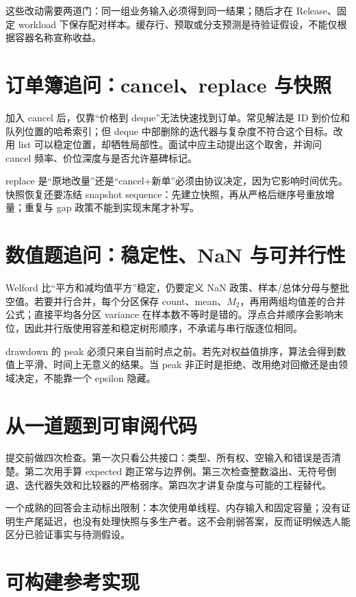 这些改动需要两道门：同一组业务输入必须得到同一结果；随后才在 Release、固定 workload 下保存配对样本。缓存行、预取或分支预测是待验证假设，不能仅根据容器名称宣称收益。

\section{订单簿追问：cancel、replace 与快照}

加入 cancel 后，仅靠“价格到 deque”无法快速找到订单。常见解法是 ID 到价位和队列位置的哈希索引；但 deque 中部删除的迭代器与复杂度不符合这个目标。改用 list 可以稳定位置，却牺牲局部性。面试中应主动提出这个取舍，并询问 cancel 频率、价位深度与是否允许墓碑标记。

replace 是“原地改量”还是“cancel+新单”必须由协议决定，因为它影响时间优先。快照恢复还要冻结 snapshot sequence：先建立快照，再从严格后继序号重放增量；重复与 gap 政策不能到实现末尾才补写。

\section{数值题追问：稳定性、NaN 与可并行性}

Welford 比“平方和减均值平方”稳定，仍要定义 NaN 政策、样本/总体分母与整批空值。若要并行合并，每个分区保存 count、mean、\(M_2\)，再用两组均值差的合并公式；直接平均各分区 variance 在样本数不等时是错的。浮点合并顺序会影响末位，因此并行版使用容差和稳定树形顺序，不承诺与串行版逐位相同。

drawdown 的 peak 必须只来自当前时点之前。若先对权益值排序，算法会得到数值上平滑、时间上无意义的结果。当 peak 非正时是拒绝、改用绝对回撤还是由领域决定，不能靠一个 epsilon 隐藏。

\section{从一道题到可审阅代码}

提交前做四次检查。第一次只看公共接口：类型、所有权、空输入和错误是否清楚。第二次用手算 expected 跑正常与边界例。第三次检查整数溢出、无符号倒退、迭代器失效和比较器的严格弱序。第四次才讲复杂度与可能的工程替代。

一个成熟的回答会主动标出限制：本次使用单线程、内存输入和固定容量；没有证明生产尾延迟，也没有处理快照与多生产者。这不会削弱答案，反而证明候选人能区分已验证事实与待测假设。

\section{可构建参考实现}

